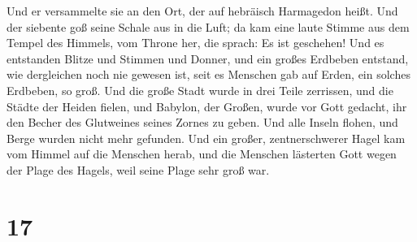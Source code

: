  Und er versammelte sie an den Ort, der auf hebräisch
Harmagedon heißt.  Und der siebente goß seine Schale aus
in die Luft; da kam eine laute Stimme aus dem Tempel des Himmels, vom
Throne her, die sprach: Es ist geschehen!  Und es
entstanden Blitze und Stimmen und Donner, und ein großes Erdbeben
entstand, wie dergleichen noch nie gewesen ist, seit es Menschen gab auf
Erden, ein solches Erdbeben, so groß.  Und die große
Stadt wurde in drei Teile zerrissen, und die Städte der Heiden fielen,
und Babylon, der Großen, wurde vor Gott gedacht, ihr den Becher des
Glutweines seines Zornes zu geben.  Und alle Inseln
flohen, und Berge wurden nicht mehr gefunden.  Und ein
großer, zentnerschwerer Hagel kam vom Himmel auf die Menschen herab, und
die Menschen lästerten Gott wegen der Plage des Hagels, weil seine Plage
sehr groß war.

\hypertarget{section-16}{%
\section{17}\label{section-16}}


